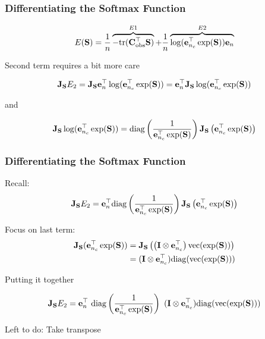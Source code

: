 \documentclass[12pt,fleqn,handout]{beamer}
\begin{document}
\begin{frame}[fragile]\frametitle{Differentiating the Softmax Function}


$$ E({\bf S}) = \frac{1}{n}\overbrace{-{\rm tr}({\bf C}_{\rm obs}^{\top} {\bf S})}^{E1} + \frac{1}{n} \overbrace{\log({\bf e}_{n_c}^\top\exp({\bf S})){\bf e}_n}^{E2}  $$


\bigskip

Second  term requires a bit more care

$$ {\bf J}_{{\bf S}}E_2 = {\bf J}_{{\bf S}} {\bf e}_n^{\top}\log({\bf e}_{n_c}^\top \exp({\bf S})) = 
 {\bf e}_n^{\top}{\bf J}_{{\bf S}}  \log({\bf e}_{n_c}^\top\exp({\bf S}))  $$

\pause 
 and
 
$$ {\bf J}_{{\bf S}}  \log({\bf e}_{n_c}^\top\exp({\bf S})) = {\rm diag}
\left( {\frac {1}{{\bf e}_{n_c}^\top\exp({\bf S})}}\right)
{\bf J}_{{\bf S}}\left({\bf e}_{n_c}^\top\exp({\bf S}) \right) $$
 

\end{frame}


\begin{frame}[fragile]\frametitle{Differentiating the Softmax Function}
	Recall:
$$ {\bf J}_{{\bf S}}  E_2 = {\bf e}_n^\top  {\rm diag}
\left( {\frac {1}{{\bf e}_{n_c}^\top\exp({\bf S})}}\right)
{\bf J}_{{\bf S}}\left({\bf e}_{n_c}^\top\exp({\bf S}) \right) $$

Focus on last term:
\begin{align*}
   {\bf J}_{{\bf S}} ({\bf e}_{n_c}^\top \exp({\bf S})) & = {\bf J}_{{\bf S}} \left(\left({\bf I} \otimes {\bf e}_{n_c}^{\top} \right)  {\rm vec}(\exp({\bf S}))\right)\\
   &  = ({\bf I} \otimes {\bf e}_{n_c}^{\top})  {\rm diag}( {\rm vec}(\exp({\bf S})))
\end{align*}
 
 \pause
 Putting it together
 
 
 $$ {\bf J}_{{\bf S}}E_2 =  {\bf e}_n^{\top}\ {\rm diag}
\left( {\frac {1}{{\bf e}_{n_c}^\top \exp({\bf S})}}\right) \  ( {\bf I} \otimes {\bf e}_{n_c}^{\top})  {\rm diag}( {\rm vec}(\exp({\bf S}))) $$


\pause

\begin{center}
	Left to do: Take transpose
\end{center}


\end{frame}
\end{document}
